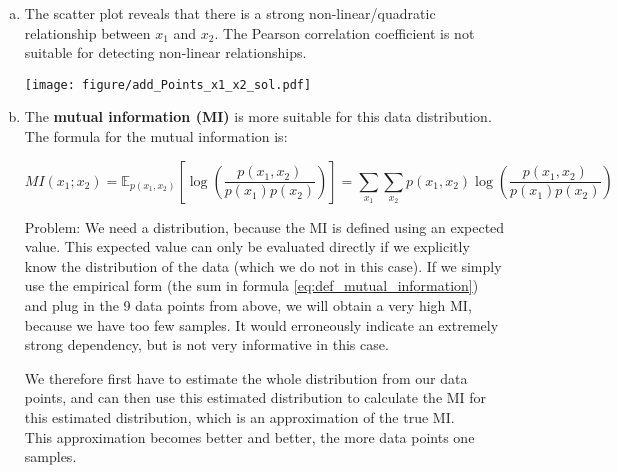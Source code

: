 {\begin{enumerate}[a)]
  \item  The scatter plot reveals that there is a strong non-linear/quadratic relationship between $x_1$ and $x_2$. The Pearson correlation coefficient is not suitable for detecting non-linear relationships.
  
	\begin{center}
	\texttt{[image: figure/add\_Points\_x1\_x2\_sol.pdf]}
	\end{center}



  \item The \textbf{mutual information (MI)} is more suitable for this data distribution. The formula for the mutual information is:
  
  \begin{equation}\label{eq:def_mutual_information}
  	MI(x_1 ; x_2 ) =  \mathbb{E}_{p(x_1, x_2)} \left[ \log\left(\frac{p(x_1, x_2)}{p(x_1) p(x_2)} \right) \right] = \sum_{x_1} \sum_{x_2} p(x_1, x_2) \log\left(\frac{p(x_1, x_2)}{p(x_1) p(x_2)} \right)
  \end{equation}
  
  Problem: We need a distribution, because the MI is defined using an expected value.
  This expected value can only be evaluated directly if we explicitly know the distribution of the data (which we do not in this case).
  If we simply use the empirical form (the sum in formula \eqref{eq:def_mutual_information}) and plug in the 9 data points from above, we will obtain a very high MI, because we have too few samples. It would erroneously indicate an extremely strong dependency, but is not very informative in this case.
  
  We therefore first have to estimate the whole distribution from our data points, and can then use this estimated distribution to calculate the MI for this estimated distribution, which is an approximation of the true MI. \\
  This approximation becomes better and better, the more data points one samples.
  
\end{enumerate}
}

